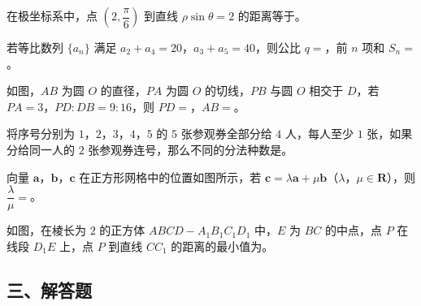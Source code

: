 \begin{question}
在极坐标系中，点 $\left(2,\dfrac{\pi}6\right)$ 到直线 $\rho\sin\theta=2$ 的距离等于\gkblank{}。

\end{question}
\begin{question}
若等比数列 $\{a_n\}$ 满足 $a_2+a_4=20$，$a_3+a_5=40$，则公比 $q=$\gkblank{}，前 $n$ 项和 $S_n=$\gkblank{}。

\Needspace{0.4\textheight}
\end{question}
\begin{question}
如图，$AB$ 为圆 $O$ 的直径，$PA$ 为圆 $O$ 的切线，$PB$ 与圆 $O$ 相交于 $D$，若 $PA=3$，$PD:DB=9:16$，则 $PD=$\gkblank{}，$AB=$\gkblank{}。
\nopagebreak[4]
\begin{center}\end{center}
\nopagebreak[4]
\end{question}
\begin{question}
将序号分别为 $1$，$2$，$3$，$4$，$5$ 的 $5$ 张参观券全部分给 $4$ 人，每人至少 $1$ 张，如果分给同一人的 $2$ 张参观券连号，那么不同的分法种数是\gkblank{}。

\Needspace{0.4\textheight}
\end{question}
\begin{question}
向量 $\boldsymbol a$，$\boldsymbol b$，$\boldsymbol c$ 在正方形网格中的位置如图所示，若 $\boldsymbol c=\lambda\boldsymbol a+\mu\boldsymbol b$（$\lambda$，$\mu\in\mathbf R$），则 $\dfrac{\lambda}{\mu}=$\gkblank{}。
\nopagebreak[4]
\begin{center}\end{center}
\nopagebreak[4]
\Needspace{0.4\textheight}
\end{question}
\begin{question}
如图，在棱长为 $2$ 的正方体 $ABCD-A_1B_1C_1D_1$ 中，$E$ 为 $BC$ 的中点，点 $P$ 在线段 $D_1E$ 上，点 $P$ 到直线 $CC_1$ 的距离的最小值为\gkblank{}。
\nopagebreak[4]
\begin{center}\end{center}
\nopagebreak[4]
\end{question}
\begingroup
\renewcommand{\gkpart}[1]{\Needspace{0.3\textheight}\subsection*{#1}\nopagebreak}
\gkpart{三、解答题}
\endgroup

